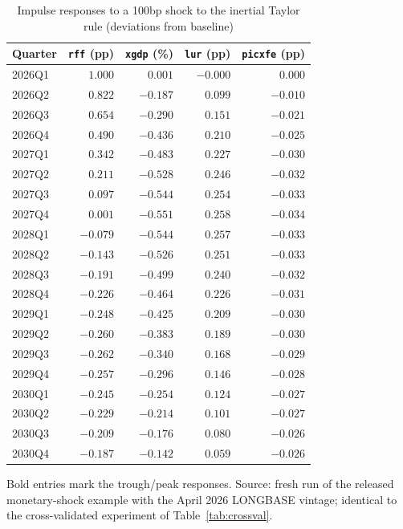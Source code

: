 \begin{table}[htbp]
\centering
\caption{Impulse responses to a 100bp shock to the inertial Taylor rule (deviations from baseline)}
\label{tab:irf}
\small
\begin{tabular}{lrrrr}
\toprule
Quarter & \texttt{rff} (pp) & \texttt{xgdp} (\%) & \texttt{lur} (pp) & \texttt{picxfe} (pp) \\
\midrule
2026Q1 & $1.000$  & $0.001$  & $-0.000$ & $0.000$ \\
2026Q2 & $0.822$  & $-0.187$ & $0.099$  & $-0.010$ \\
2026Q3 & $0.654$  & $-0.290$ & $0.151$  & $-0.021$ \\
2026Q4 & $0.490$  & $-0.436$ & $0.210$  & $-0.025$ \\
2027Q1 & $0.342$  & $-0.483$ & $0.227$  & $-0.030$ \\
2027Q2 & $0.211$  & $-0.528$ & $0.246$  & $-0.032$ \\
2027Q3 & $0.097$  & $-0.544$ & $0.254$  & $-0.033$ \\
2027Q4 & $0.001$  & $\mathbf{-0.551}$ & $\mathbf{0.258}$ & $\mathbf{-0.034}$ \\
2028Q1 & $-0.079$ & $-0.544$ & $0.257$  & $-0.033$ \\
2028Q2 & $-0.143$ & $-0.526$ & $0.251$  & $-0.033$ \\
2028Q3 & $-0.191$ & $-0.499$ & $0.240$  & $-0.032$ \\
2028Q4 & $-0.226$ & $-0.464$ & $0.226$  & $-0.031$ \\
2029Q1 & $-0.248$ & $-0.425$ & $0.209$  & $-0.030$ \\
2029Q2 & $-0.260$ & $-0.383$ & $0.189$  & $-0.030$ \\
2029Q3 & $-0.262$ & $-0.340$ & $0.168$  & $-0.029$ \\
2029Q4 & $-0.257$ & $-0.296$ & $0.146$  & $-0.028$ \\
2030Q1 & $-0.245$ & $-0.254$ & $0.124$  & $-0.027$ \\
2030Q2 & $-0.229$ & $-0.214$ & $0.101$  & $-0.027$ \\
2030Q3 & $-0.209$ & $-0.176$ & $0.080$  & $-0.026$ \\
2030Q4 & $-0.187$ & $-0.142$ & $0.059$  & $-0.026$ \\
\bottomrule
\end{tabular}

\medskip
\parbox{0.92\textwidth}{\footnotesize Bold entries mark the trough/peak responses. Source: fresh run of the released monetary-shock example with the April 2026 LONGBASE vintage; identical to the cross-validated experiment of Table~\ref{tab:crossval}.}
\end{table}

